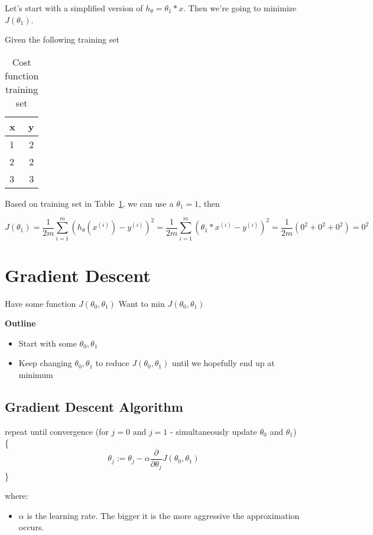 \documentclass[a4paper]{article}
\begin{document}
Let's start with a simplified version of $h_\theta = \theta_1 * x$. Then we're going to minimize $J(\theta_1)$.

Given the following training set\:

\begin{table}[]
\centering
\label{tab:cost-function-training-set}
\begin{tabular}{l|r}
\textbf{x} & \textbf{y} \\\hline
1     & 2 \\
2     & 2 \\
3     & 3
\end{tabular}
\caption{Cost function training set}
\end{table}

Based on training set in Table~\ref{tab:cost-function-training-set}, we can use a $\theta_1 = 1$, then\:

$$
J(\theta_1) = \frac{1}{2m}\sum_{i=1}^{m}(h_\theta(x^{(i)}) - y^{(i)})^2
= \frac{1}{2m}\sum_{i=1}^{m}(\theta_1 * x^{(i)} - y^{(i)})^2 = \frac{1}{2m}(0^2 + 0^2 + 0^2) = 0^2$$

\section{Gradient Descent}

Have some function $J(\theta_0,\theta_1)$
Want to min $J(\theta_0,\theta_1)$

\textbf{Outline}
\begin{itemize}
\item Start with some $\theta_0, \theta_1$
\item Keep changing $\theta_0, \theta_1$ to reduce $J(\theta_0,\theta_1)$ until we hopefully end up at minimum
\end{itemize}

\subsection{Gradient Descent Algorithm}

repeat until convergence (for $j=0$ and $j=1$ - simultaneously update $\theta_0$ and $\theta_1$) \{
$$
\theta_j := \theta_j - \alpha \frac{\partial}{\partial \theta_j}J(\theta_0, \theta_1)
$$
\}

\medskip

where:

\begin{itemize}
\item $\alpha$\: is the learning rate. The bigger it is the more aggressive the approximation occurs.
\end{itemize}
\end{document}
